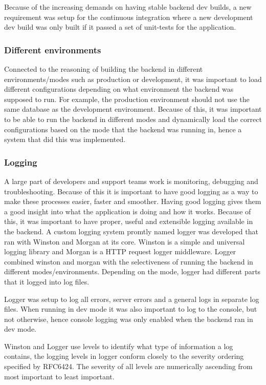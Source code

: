 Because of the increasing demands on having stable backend dev builds, a new requirement was setup for the continuous integration where a new development dev build was only built if it passed a set of unit-tests for the application.

\subsubsection{Different environments}
Connected to the reasoning of building the backend in different environments/modes such as production or development, it was important to load different configurations depending on what environment the backend was supposed to run. For example, the production environment should not use the same database as the development environment. Because of this, it was important to be able to run the backend in different modes and dynamically load the correct configurations based on the mode that the backend was running in, hence a system that did this was implemented.

\subsubsection{Logging} \label{logging}
A large part of developers and support teams work is monitoring, debugging and troubleshooting. Because of this it is important to have good logging as a way to make these processes easier, faster and smoother. Having good logging gives them a good insight into what the application is doing and how it works. Because of this, it was important to have proper, useful and extensible logging available in the backend. A custom logging system promtly named logger was developed that ran with Winston and Morgan at its core. Winston is a simple and universal logging library and Morgan is a HTTP request logger middleware. Logger combined winston and morgan with the selectiveness of running the backend in different modes/environments. Depending on the mode, logger had different parts that it logged into log files.

Logger was setup to log all errors, server errors and a general logs in separate log files. When running in dev mode it was also important to log to the console, but not otherwise, hence console logging was only enabled when the backend ran in dev mode. 

Winston and Logger use levels to identify what type of information a log contains, the logging levels in logger conform closely to the severity ordering specified by RFC6424.
The severity of all levels are numerically ascending from most important to least important.

